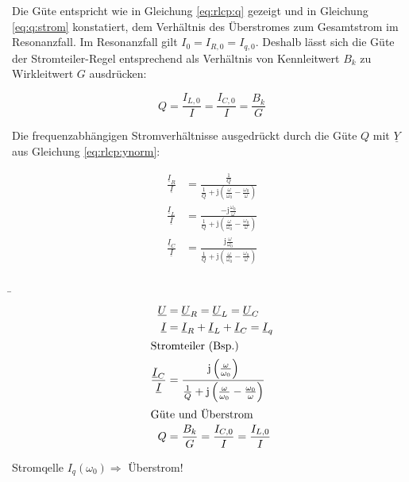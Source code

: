 \begin{frame}
{        %
        Die Güte entspricht wie in Gleichung \ref{eq:rlcp:q} gezeigt und in Gleichung \ref{eq:q:strom} konstatiert,
        dem Verhältnis des Überstromes zum Gesamtstrom im Resonanzfall. Im Resonanzfall gilt $I_0 = I_{R,0} = I_{q,0}$.
        Deshalb lässt sich die Güte der Stromteiler-Regel entsprechend als Verhältnis von Kennleitwert $B_k$ zu Wirkleitwert $G$ ausdrücken:

        \begin{equation}
            Q = \frac{I_{L,0}}{I} = \frac{I_{C,0}}{I} = \frac{B_k}{G}
        \end{equation}

        Die frequenzabhängigen Stromverhältnisse ausgedrückt durch die Güte $Q$ mit $\underline{Y}$ aus Gleichung \ref{eq:rlcp:ynorm}:

        \begin{equation}\label{eq:rlcp:ibk:iq:q}
            \begin{aligned}
                \frac{\underline{I}_R}{\underline{I}} &= 
                \frac{\frac{1}{Q}}{\frac{1}{Q}+\mathrm{j}\left(\frac{\omega}{\omega_0}-\frac{\omega_0}{\omega}\right)}\\
            \frac{\underline{I}_L}{\underline{I}} &= 
                \frac{-\mathrm{j}\frac{\omega_0}{\omega}}{\frac{1}{Q}+\mathrm{j}\left(\frac{\omega}{\omega_0}-\frac{\omega_0}{\omega}\right)}\\
            \frac{\underline{I}_C}{\underline{I}} &=
                \frac{\mathrm{j}\frac{\omega}{\omega_0}}{\frac{1}{Q}+\mathrm{j}\left(\frac{\omega}{\omega_0}-\frac{\omega_0}{\omega}\right)}
            \end{aligned}
        \end{equation}
    }%
    \b{%
    \begin{minipage}{0.3\textwidth}%
    \begin{align}    %
        \underline{U} &= \underline{U}_R = \underline{U}_L = \underline{U}_C \\
        \underline{I} &= \underline{I}_R + \underline{I}_L + \underline{I}_C = \underline{I}_q\\
            \intertext{Stromteiler (Bsp.)}
        \frac{\underline{I}_C}{\underline{I}} &= \frac{\mathrm{j}\left(\frac{\omega}{\omega_0}\right)}{\frac{1}{Q}+\mathrm{j}\left(\frac{\omega}{\omega_0}-\frac{\omega_0}{\omega}\right)}\\
            \intertext{Güte und Überstrom}
        Q &= \frac{B_k}{G} = \frac{I_{C,0}}{I} = \frac{I_{L,0}}{I}
    \end{align}
    \end{minipage}\hfill%
    \begin{minipage}{0.65\textwidth}\centering
        Stromqelle $I_q(\omega_0) \Rightarrow$ Überstrom!
    \end{minipage}
    }
    \end{frame}

